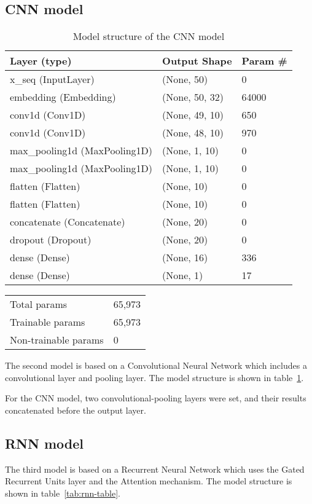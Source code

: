 \documentclass[runningheads]{llncs}
\begin{document}
\subsection{CNN model}
\begin{table}
\centering
\begin{tabular}{|l|l|l|}
\hline
\rowcolor[HTML]{C0C0C0} 
\textbf{Layer (type)} & \textbf{Output Shape} & \textbf{Param \#} \\ \hline
x\_seq (InputLayer) & (None, 50) & 0 \\ \hline
embedding (Embedding) & (None, 50, 32) & 64000 \\ \hline
conv1d (Conv1D) & (None, 49, 10) & 650 \\ \hline
conv1d (Conv1D) & (None, 48, 10) & 970 \\ \hline
max\_pooling1d (MaxPooling1D) & (None, 1, 10) & 0 \\ \hline
max\_pooling1d (MaxPooling1D) & (None, 1, 10) & 0 \\ \hline
flatten (Flatten) & (None, 10) & 0 \\ \hline
flatten (Flatten) & (None, 10) & 0 \\ \hline
concatenate (Concatenate) & (None, 20) & 0 \\ \hline
dropout (Dropout) & (None, 20) & 0 \\ \hline
dense (Dense) & (None, 16) & 336 \\ \hline
dense (Dense) & (None, 1) & 17 \\ \hline
\end{tabular}
\caption{Model structure of the CNN model}
\label{tab:cnn-table}
\end{table}

\begin{table}
\centering
\begin{tabular}{ll}
Total params & 65,973 \\
Trainable params & 65,973 \\
Non-trainable params & 0
\end{tabular}
\end{table}

The second model is based on a Convolutional Neural Network which includes a convolutional layer and pooling layer. The model structure is shown in table~\ref{tab:cnn-table}.

For the CNN model, two convolutional-pooling layers were set, and their results concatenated before the output layer.

\subsection{RNN model}
The third model is based on a Recurrent Neural Network which uses the Gated Recurrent Units layer and the Attention mechanism. The model structure is shown in table~\ref{tab:rnn-table}.
\end{document}
